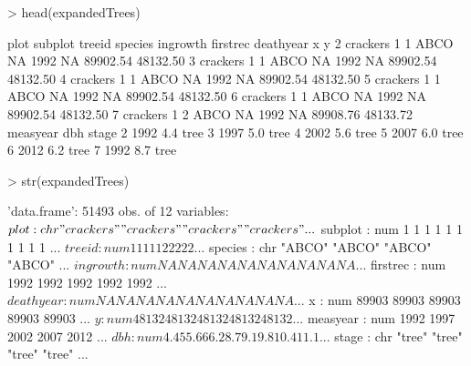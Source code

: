 \documentclass{report}
\begin{document}
\begin{Schunk}
\begin{Sinput}
> head(expandedTrees)
\end{Sinput}
\begin{Soutput}
      plot subplot treeid species ingrowth firstrec deathyear        x        y
2 crackers       1      1    ABCO       NA     1992        NA 89902.54 48132.50
3 crackers       1      1    ABCO       NA     1992        NA 89902.54 48132.50
4 crackers       1      1    ABCO       NA     1992        NA 89902.54 48132.50
5 crackers       1      1    ABCO       NA     1992        NA 89902.54 48132.50
6 crackers       1      1    ABCO       NA     1992        NA 89902.54 48132.50
7 crackers       1      2    ABCO       NA     1992        NA 89908.76 48133.72
  measyear dbh stage
2     1992 4.4  tree
3     1997 5.0  tree
4     2002 5.6  tree
5     2007 6.0  tree
6     2012 6.2  tree
7     1992 8.7  tree
\end{Soutput}
\begin{Sinput}
> str(expandedTrees)
\end{Sinput}
\begin{Soutput}
'data.frame':	51493 obs. of  12 variables:
 $ plot     : chr  "crackers" "crackers" "crackers" "crackers" ...
 $ subplot  : num  1 1 1 1 1 1 1 1 1 1 ...
 $ treeid   : num  1 1 1 1 1 2 2 2 2 2 ...
 $ species  : chr  "ABCO" "ABCO" "ABCO" "ABCO" ...
 $ ingrowth : num  NA NA NA NA NA NA NA NA NA NA ...
 $ firstrec : num  1992 1992 1992 1992 1992 ...
 $ deathyear: num  NA NA NA NA NA NA NA NA NA NA ...
 $ x        : num  89903 89903 89903 89903 89903 ...
 $ y        : num  48132 48132 48132 48132 48132 ...
 $ measyear : num  1992 1997 2002 2007 2012 ...
 $ dbh      : num  4.4 5 5.6 6 6.2 8.7 9.1 9.8 10.4 11.1 ...
 $ stage    : chr  "tree" "tree" "tree" "tree" ...
\end{Soutput}
\end{Schunk}
\end{document}
